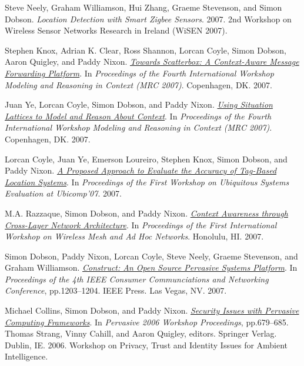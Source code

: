 \documentclass[11pt]{article}
\begin{document}
\label{orgff6cd24}Steve Neely, Graham Williamson, Hui Zhang, Graeme Stevenson, and Simon Dobson.  \emph{Location Detection with Smart Zigbee Sensors}. 2007. 2nd Workshop on Wireless Sensor Networks Research in Ireland (WiSEN 2007).

\label{org7cdf03d}Stephen Knox, Adrian K. Clear, Ross Shannon, Lorcan Coyle, Simon Dobson, Aaron Quigley, and Paddy Nixon.  \emph{\href{https://simondobson.org/softcopy/mrc-scatterbox-07.pdf}{Towards Scatterbox: A Context-Aware Message Forwarding Platform}}. In \emph{Proceedings of the Fourth International Workshop Modeling and Reasoning in Context (MRC 2007)}. Copenhagen, DK. 2007.

\label{org469c743}Juan Ye, Lorcan Coyle, Simon Dobson, and Paddy Nixon.  \emph{\href{https://simondobson.org/softcopy/mrc-lattices-07.pdf}{Using Situation Lattices to Model and Reason About Context}}. In \emph{Proceedings of the Fourth International Workshop Modeling and Reasoning in Context (MRC 2007)}. Copenhagen, DK. 2007.

\label{org3fee6b9}Lorcan Coyle, Juan Ye, Emerson Loureiro, Stephen Knox, Simon Dobson, and Paddy Nixon.  \emph{\href{https://simondobson.org/softcopy/use07.pdf}{A Proposed Approach to Evaluate the Accuracy of Tag-Based Location Systems}}. In \emph{Proceedings of the First Workshop on Ubiquitous Systems Evaluation at Ubicomp’07}. 2007.

\label{org85d6070}M.A. Razzaque, Simon Dobson, and Paddy Nixon.  \emph{\href{https://simondobson.org/softcopy/wiman-07.pdf}{Context Awareness through Cross-Layer Network Architecture}}. In \emph{Proceedings of the First International Workshop on Wireless Mesh and Ad Hoc Networks}. Honolulu, HI. 2007.

\label{org40b4e7d}Simon Dobson, Paddy Nixon, Lorcan Coyle, Steve Neely, Graeme Stevenson, and Graham Williamson.  \emph{\href{https://simondobson.org/softcopy/ccnc-07.pdf}{Construct: An Open Source Pervasive Systems Platform}}. In \emph{Proceedings of the 4th IEEE Consumer Communciations and Networking Conference}, pp.1203–1204. IEEE Press. Las Vegas, NV. 2007.

\label{org40c8204}Michael Collins, Simon Dobson, and Paddy Nixon.  \emph{\href{https://simondobson.org/softcopy/ptiiai-06.pdf}{Security Issues with Pervasive Computing Frameworks}}. In \emph{Pervasive 2006 Workshop Proceedings}, pp.679–685. Thomas Strang, Vinny Cahill, and Aaron Quigley, editors. Springer Verlag. Dublin, IE. 2006. Workshop on Privacy, Trust and Identity Issues for Ambient Intelligence.
\end{document}
